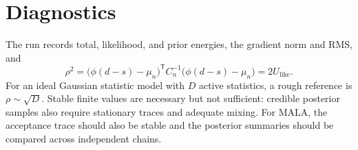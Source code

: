 \documentclass[11pt]{article}
\begin{document}
\section{Diagnostics}

The run records total, likelihood, and prior energies, the gradient norm and
RMS, and
\begin{equation}
    \rho^2
    =\bigl(\phi(d-s)-\mu_n\bigr)^{\mathsf T}
      C_n^{-1}\bigl(\phi(d-s)-\mu_n\bigr)
    =2U_{\mathrm{like}}.
\end{equation}
For an ideal Gaussian statistic model with $D$ active statistics, a rough
reference is $\rho\sim\sqrt{D}$.  Stable finite values are necessary but not
sufficient: credible posterior samples also require stationary traces and
adequate mixing.  For MALA, the acceptance trace should also be stable and the
posterior summaries should be compared across independent chains.
\end{document}
